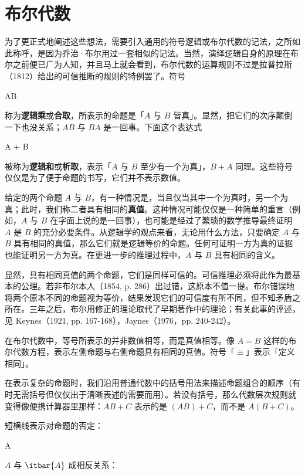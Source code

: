 \section{布尔代数}

为了更正式地阐述这些想法，需要引入通用的符号逻辑或布尔代数的记法，之所如此称呼，是因为乔治·布尔用过一套相似的记法。当然，演绎逻辑自身的原理在布尔之前便已广为人知，并且马上就会看到，布尔代数的运算规则不过是拉普拉斯（1812）给出的可信推断的规则的特例罢了。符号

\placeformula
\startformula
AB
\stopformula

称为{\bf 逻辑乘}或{\bf 合取}，所表示的命题是「$A$ 与 $B$ 皆真」。显然，把它们的次序颠倒一下也没关系；$AB$ 与 $BA$ 是一回事。下面这个表达式

\placeformula
\startformula
A + B
\stopformula

被称为{\bf 逻辑和}或{\bf 析取}，表示「$A$ 与 $B$ 至少有一个为真」，$B + A$ 同理。这些符号仅仅是为了便于命题的书写，它们并不表示数值。

给定的两个命题 $A$ 与 $B$，有一种情况是，当且仅当其中一个为真时，另一个为真；此时，我们称二者具有相同的{\bf 真值}。这种情况可能仅仅是一种简单的重言（例如，$A$ 与 $B$ 在字面上说的是一回事），也可能是经过了繁琐的数学推导最终证明 $A$ 是 $B$ 的充分必要条件。从逻辑学的观点来看，无论用什么方法，只要确定 $A$ 与 $B$ 具有相同的真值，那么它们就是逻辑等价的命题。任何可证明一方为真的证据也能证明另一方为真。在更进一步的推理过程中，$A$ 与 $B$ 具有相同的含义。

显然，具有相同真值的两个命题，它们是同样可信的。可信推理必须将此作为最基本的公理。若非布尔本人（1854, p. 286）出过错，这原本不值一提。布尔错误地将两个原本不同的命题视为等价，结果发现它们的可信度有所不同，但不知矛盾之所在。三年之后，布尔用修正的理论取代了早期著作中的理论；有关此事的评述，见 Keynes（1921, pp. 167-168），Jaynes（1976，pp. 240-242）。

在布尔代数中，等号所表示的并非数值相等，而是真值相等。像 $A = B$ 这样的布尔代数方程，表示左侧命题与右侧命题具有相同的真值。符号「$\equiv$」表示「定义相同」。

在表示复杂的命题时，我们沿用普通代数中的括号用法来描述命题组合的顺序（有时无需括号但仅仅出于清晰表述的需要而用）。若没有括号，那么代数层次规则就变得像便携计算器里那样：$AB + C$ 表示的是 $(AB) + C$，而不是 $A(B + C)$。

短横线表示对命题的否定：

\placeformula[1-8]
\startformula
{} \equiv A
\stopformula

$A$ 与 $\itbar{A}$ 成相反关系：

